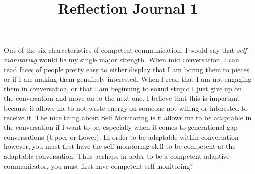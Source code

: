 \documentclass[12pt]{article}
\begin{document}
\title{Reflection Journal 1}




\par
Out of the six characteristics of competent communication, I would say that \emph{self-monitoring} would be my single major strength. When mid conversation, I can read faces of people pretty easy to either display that I am boring them to pieces or if I am making them genuinely interested. When I read that I am not engaging them in conversation, or that I am beginning to sound stupid I just give up on the conversation and move on to the next one. I believe that this is important because it allows me to not waste energy on someone not willing or interested to receive it. The nice thing about Self Monitoring is it allows me to be adaptable in the conversation if I want to be, especially when it comes to generational gap conversations (Upper or Lower). In order to be adaptable within conversation however, you must first have the self-monitoring skill to be competent at the adaptable conversation. Thus perhaps in order to be a competent adaptive communicator, you must first have competent self-monitoring?
\par 
\end{document}
